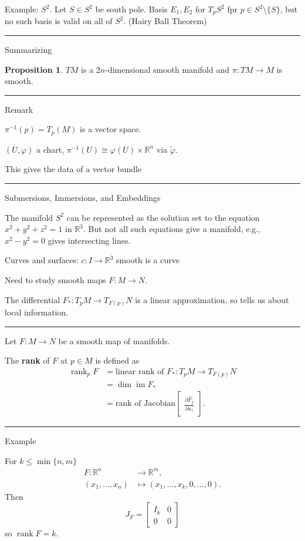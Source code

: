 \documentclass[12pt]{article}
\newcommand{\keyword}[1]{\textbf{#1}}
\newcommand{\sepline}{\rule{\textwidth}{0.4pt}}
\theoremstyle{definition}
\newtheorem{proposition}{Proposition}
\newcommand{\R}{\mathbb{R}}
\renewcommand{\phi}{\varphi}
\newcommand{\<}{\left\langle}
\renewcommand{\>}{\right\rangle}
\newcommand{\iso}{\cong}
\newcommand{\To}{\longrightarrow}
\newcommand{\Mapsto}{\longmapsto}
\DeclareMathOperator{\im}{im}
\DeclareMathOperator{\rank}{rank}
\newcommand{\pdv}[2]{\frac{\partial #1}{\partial #2}}
\newcommand{\mat}[1]{\begin{bmatrix}#1\end{bmatrix}}
\renewcommand{\hat}{\widehat}
\renewcommand{\tilde}{\widetilde}
\begin{document}
Example: $S^2$.
Let $S \in S^2$ be south pole.
Basis $E_1, E_2$ for $T_pS^2$ fpr $p \in S^2 \setminus \{S\}$, but no such basis is valid on all of $S^2$.
(Hairy Ball Theorem)


\sepline

Summarizing

\begin{proposition}
    $TM$ is a $2n$-dimensional smooth manifold and $\pi : TM \to M$ is smooth.
\end{proposition}

\sepline

Remark

$\pi^{-1}(p) = T_p(M)$ is a vector space.

$(U, \phi)$ a chart, $\pi^{-1}(U) \iso \phi(U) \times \R^n$ via $\tilde{\phi}$.

This gives the data of a vector bundle

\sepline

Submersions, Immersions, and Embeddings

The manifold $S^2$ can be represented as the solution set to the equation $x^2 + y^2 + z^2 = 1$ in $\R^3$.
But not all such equations give a manifold, e.g., $x^2 - y^2 = 0$ gives intersecting lines.

Curves and surfaces: $c : I \to \R^3$ smooth is a curve

Need to study smooth maps $F : M \to N$.

The differential $F_* : T_pM \to T_{F(p)}N$ is a linear approximation, so tells us about local information.

\sepline

Let $F : M \to N$ be a smooth map of manifolds.

The \keyword{rank} of $F$ at $p \in M$ is defined as
\begin{align*}
    \rank_pF
        &= \text{linear rank of } F_* : T_pM \to T_{F(p)}N \\
        &= \dim\im F_* \\
        &= \text{rank of Jacobian} \mat{\pdv{\hat{F}_j}{x_i}}.
\end{align*}

\sepline

Example

For $k \leq \min\{n, m\}$
\begin{align*}
    F : \R^n &\To \R^m, \\
        (x_1, \dots, x_n) &\Mapsto (x_1, \dots, x_k, 0, \dots, 0).
\end{align*}
Then
\[
    J_F = \mat{I_k & 0 \\ 0 & 0}
\]
so $\rank F = k$.
\end{document}
